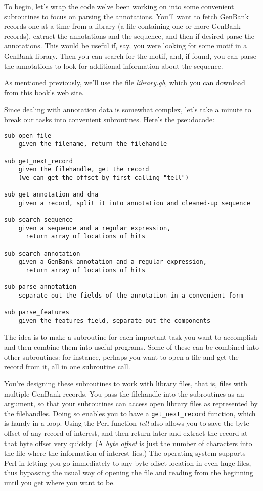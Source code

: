 To begin, let's wrap the code we've been working on into some convenient subroutines to focus on parsing the annotations. You'll want to fetch GenBank records one at a time from a library (a file containing one or more GenBank records), extract the annotations and the sequence, and then if desired parse the annotations. This would be useful if, say, you were looking for some motif in a GenBank library. Then you can search for the motif, and, if found, you can parse the annotations to look for additional information about the sequence.

As mentioned previously, we'll use the file \textit{library.gb}, which you can download from this book's web site.

Since dealing with annotation data is somewhat complex, let's take a minute to break our tasks into convenient subroutines. Here's the pseudocode:

\begin{lstlisting}
sub open_file
    given the filename, return the filehandle

sub get_next_record
    given the filehandle, get the record
    (we can get the offset by first calling "tell")

sub get_annotation_and_dna
    given a record, split it into annotation and cleaned-up sequence

sub search_sequence
    given a sequence and a regular expression,
      return array of locations of hits

sub search_annotation
    given a GenBank annotation and a regular expression,
      return array of locations of hits

sub parse_annotation
    separate out the fields of the annotation in a convenient form

sub parse_features
    given the features field, separate out the components
\end{lstlisting}

The idea is to make a subroutine for each important task you want to accomplish and then combine them into useful programs. Some of these can be combined into other subroutines: for instance, perhaps you want to open a file and get the record from it, all in one subroutine call.

You're designing these subroutines to work with library files, that is, files with multiple GenBank records. You pass the filehandle into the subroutines as an argument, so that your subroutines can access open library files as represented by the filehandles. Doing so enables you to have a \verb|get_next_record| function, which is handy in a loop. Using the Perl function \textit{tell} also allows you to save the byte offset of any record of interest, and then return later and extract the record at that byte offset very quickly. (A \textit{byte offset} is just the number of characters into the file where the information of interest lies.) The operating system supports Perl in letting you go immediately to any byte offset location in even huge files, thus bypassing the usual way of opening the file and reading from the beginning until you get where you want to be.  

